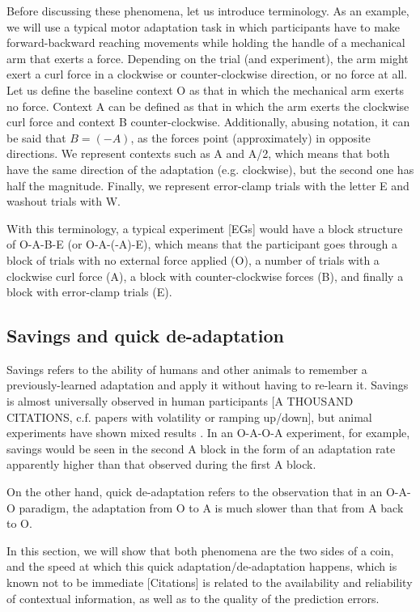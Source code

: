 \documentclass[a4paper,doc,floatsintext,natbib]{apa6}
\begin{document}
Before discussing these phenomena, let us introduce terminology. As an example, we will use a typical motor adaptation task in which participants have to make forward-backward reaching movements while holding the handle of a mechanical arm that exerts a force. Depending on the trial (and experiment), the arm might exert a curl force in a clockwise or counter-clockwise direction, or no force at all. Let us define the baseline context O as that in which the mechanical arm exerts no force. Context A can be defined as that in which the arm exerts the clockwise curl force and context B counter-clockwise. Additionally, abusing notation, it can be said that $B = (-A)$, as the forces point (approximately) in opposite directions. We represent contexts such as A and A/2, which means that both have the same direction of the adaptation (e.g. clockwise), but the second one has half the magnitude. Finally, we represent error-clamp trials with the letter E and washout trials with W.

With this terminology, a typical experiment [EGs] would have a block structure of O-A-B-E (or O-A-(-A)-E), which means that the participant goes through a block of trials with no external force applied (O), a number of trials with a clockwise curl force (A), a block with counter-clockwise forces (B), and finally a block with error-clamp trials (E).

\subsection{Savings and quick de-adaptation}
Savings refers to the ability of humans and other animals to remember a previously-learned adaptation and apply it without having to re-learn it. Savings is almost universally observed in human participants [A THOUSAND CITATIONS, c.f. papers with volatility or ramping up/down], but animal experiments have shown mixed results \citep[e.g.][]{Kojima_Memory_2004}. In an O-A-O-A experiment, for example, savings would be seen in the second A block in the form of an adaptation rate apparently higher than that observed during the first A block.

On the other hand, quick de-adaptation refers to the observation that in an O-A-O paradigm, the adaptation from O to A is much slower than that from A back to O.

In this section, we will show that both phenomena are the two sides of a coin, and the speed at which this quick adaptation/de-adaptation happens, which is known not to be immediate [Citations] is related to the availability and reliability of contextual information, as well as to the quality of the prediction errors.
\end{document}
